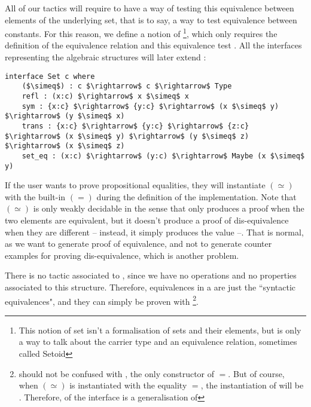 All of our tactics will require to have a way of testing this equivalence between elements of the underlying set, that is to say, a way to test equivalence between constants. For this reason, we define a notion of \footnote{This notion of set isn't a formalisation of sets and their elements, but is only a way to talk about the carrier type and an equivalence relation, sometimes called Setoid}, which only requires the definition of the equivalence relation and this equivalence test . All the interfaces representing the algebraic structures will later extend  :

\begin{lstlisting}
interface Set c where
    ($\simeq$) : c $\rightarrow$ c $\rightarrow$ Type
    refl : (x:c) $\rightarrow$ x $\simeq$ x
    sym : {x:c} $\rightarrow$ {y:c} $\rightarrow$ (x $\simeq$ y) $\rightarrow$ (y $\simeq$ x)
    trans : {x:c} $\rightarrow$ {y:c} $\rightarrow$ {z:c} $\rightarrow$ (x $\simeq$ y) $\rightarrow$ (y $\simeq$ z) $\rightarrow$ (x $\simeq$ z)    
    set_eq : (x:c) $\rightarrow$ (y:c) $\rightarrow$ Maybe (x $\simeq$ y)
\end{lstlisting}

If the user wants to prove propositional equalities, they will instantiate $(\simeq)$ with the built-in $(=)$ during the definition of the  implementation.
Note that $(\simeq)$ is only weakly decidable in the sense that  only produces a proof when the two elements are equivalent, but it doesn't produce a proof of dis-equivalence when they are different -- instead, it simply produces the value --. That is normal, as we want to generate proof of equivalence, and not to generate counter examples for proving dis-equivalence, which is another problem.

There is no tactic associated to , since we have no operations and no properties associated to this structure. Therefore, equivalences in a  are just the ``syntactic equivalences", and they can simply be proven with \footnote{ should not be confused with , the only constructor of $=$. But of course, when $(\simeq)$ is instantiated with the equality $=$, the instantiation of  will be . Therefore,  of the interface  is a generalisation of }.


